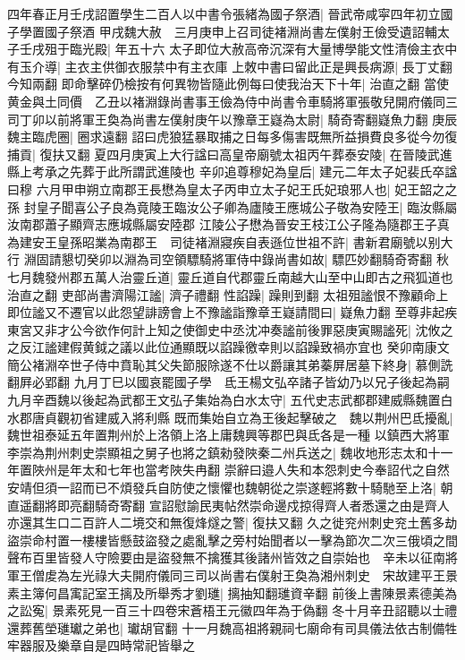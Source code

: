 四年春正月壬戌詔置學生二百人以中書令張緒為國子祭酒|{
	晉武帝咸寜四年初立國子學置國子祭酒}
甲戌魏大赦　三月庚申上召司徒褚淵尚書左僕射王儉受遺詔輔太子壬戌殂于臨光殿|{
	年五十六}
太子即位大赦高帝沉深有大量博學能文性清儉主衣中有玉介導|{
	主衣主供御衣服禁中有主衣庫}
上敇中書曰留此正是興長病源|{
	長丁丈翻今知兩翻}
即命擊碎仍檢按有何異物皆隨此例每曰使我治天下十年|{
	治直之翻}
當使黄金與土同價　乙丑以褚淵錄尚書事王儉為侍中尚書令車騎將軍張敬兒開府儀同三司丁卯以前將軍王奐為尚書左僕射庚午以豫章王嶷為太尉|{
	騎奇寄翻嶷魚力翻}
庚辰魏主臨虎圈|{
	圈求遠翻}
詔曰虎狼猛暴取捕之日每多傷害既無所益損費良多從今勿復捕貢|{
	復扶又翻}
夏四月庚寅上大行諡曰高皇帝廟號太祖丙午葬泰安陵|{
	在晉陵武進縣上考承之先葬于此所謂武進陵也}
辛卯追尊穆妃為皇后|{
	建元二年太子妃裴氏卒諡曰穆}
六月甲申朔立南郡王長懋為皇太子丙申立太子妃王氏妃琅邪人也|{
	妃王韶之之孫}
封皇子聞喜公子良為竟陵王臨汝公子卿為廬陵王應城公子敬為安陸王|{
	臨汝縣屬汝南郡蕭子顯齊志應城縣屬安陸郡}
江陵公子懋為晉安王枝江公子隆為隨郡王子真為建安王皇孫昭業為南郡王　司徒褚淵寢疾自表遜位世祖不許|{
	書新君廟號以别大行}
淵固請懇切癸卯以淵為司空領驃騎將軍侍中錄尚書如故|{
	驃匹妙翻騎奇寄翻}
秋七月魏發州郡五萬人治靈丘道|{
	靈丘道自代郡靈丘南越大山至中山即古之飛狐道也治直之翻}
吏部尚書濟陽江謐|{
	濟子禮翻}
性諂躁|{
	躁則到翻}
太祖殂謐恨不豫顧命上即位謐又不遷官以此怨望誹謗會上不豫謐詣豫章王嶷請間曰|{
	嶷魚力翻}
至尊非起疾東宮又非才公今欲作何計上知之使御史中丞沈冲奏謐前後罪惡庚寅賜謐死|{
	沈攸之之反江謐建假黄鉞之議以此位通顯既以諂躁徼幸則以諂躁致禍亦宜也}
癸卯南康文簡公褚淵卒世子侍中賁恥其父失節服除遂不仕以爵讓其弟蓁屏居墓下終身|{
	慕側詵翻屛必郢翻}
九月丁巳以國哀罷國子學　氐王楊文弘卒諸子皆幼乃以兄子後起為嗣九月辛酉魏以後起為武都王文弘子集始為白水太守|{
	五代史志武都郡建威縣魏置白水郡唐貞觀初省建威入將利縣}
既而集始自立為王後起擊破之　魏以荆州巴氐擾亂|{
	魏世祖泰延五年置荆州於上洛領上洛上庸魏興等郡巴與氐各是一種}
以鎮西大將軍李崇為荆州刺史崇顯祖之舅子也將之鎮勑發陜秦二州兵送之|{
	魏收地形志太和十一年置陜州是年太和七年也當考陜失冉翻}
崇辭曰邉人失和本怨刺史今奉詔代之自然安靖但須一詔而已不煩發兵自防使之懷懼也魏朝從之崇遂輕將數十騎馳至上洛|{
	朝直遥翻將即亮翻騎奇寄翻}
宣詔慰諭民夷帖然崇命邊戍掠得齊人者悉還之由是齊人亦還其生口二百許人二境交和無復烽燧之警|{
	復扶又翻}
久之徙兖州刺史兖土舊多劫盜崇命村置一樓樓皆懸鼓盜發之處亂擊之旁村始聞者以一擊為節次二次三俄頃之間聲布百里皆發人守險要由是盜發無不擒獲其後諸州皆效之自崇始也　辛未以征南將軍王僧䖍為左光祿大夫開府儀同三司以尚書右僕射王奐為湘州刺史　宋故建平王景素主簿何昌㝢記室王摛及所舉秀才劉璡|{
	摛抽知翻璡資辛翻}
前後上書陳景素德美為之訟寃|{
	景素死見一百三十四卷宋蒼梧王元徽四年為于偽翻}
冬十月辛丑詔聽以士禮還葬舊塋璡瓛之弟也|{
	瓛胡官翻}
十一月魏高祖將親祠七廟命有司具儀法依古制備牲牢器服及樂章自是四時常祀皆舉之

